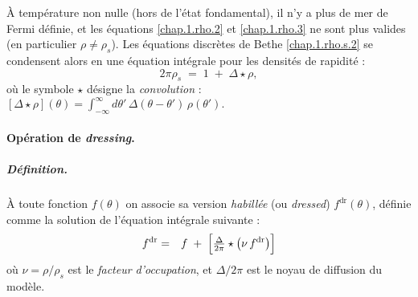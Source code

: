 À température non nulle (hors de l’état fondamental), il n’y a plus de mer de Fermi définie, et les équations \eqref{chap.1.rho.2} et \eqref{chap.1.rho.3} ne sont plus valides (en particulier $\rho \neq \rho_s$). Les équations discrètes de Bethe \eqref{chap.1.rho.s.2} se condensent alors en une équation intégrale pour les densités de rapidité :
\
\begin{equation}
	2\pi \rho_s \;=\; 1 \;+\;\Delta \star \rho,
\label{eq:TBA-rhos}
\end{equation}
où le symbole $\star$ désigne la \emph{convolution} :
\(
	[\Delta \star \rho](\theta) = \int_{-\infty}^{\infty} d\theta' \, \Delta(\theta - \theta') \, \rho(\theta').
\)




\paragraph{Opération de \emph{dressing}.}
\subparagraph{Définition.}
À toute fonction $f(\theta)$ on associe sa version \emph{habillée} (ou \emph{dressed}) $f^{\mathrm{dr}}(\theta)$, définie comme la solution de l’équation intégrale suivante :
\begin{eqnarray}
	f^{\mathrm{dr}} & = & f  \;+\;\Bigl[\tfrac{\Delta}{2\pi}\star\bigl(\nu\,f^{\mathrm{dr}}\bigr)\Bigr] \label{eq:dressing}	
\end{eqnarray}
où $\nu = \rho/\rho_s$ est le \emph{facteur d’occupation}, et $\Delta/2\pi$ est le noyau de diffusion du modèle.

